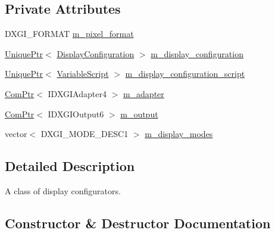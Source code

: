 \subsection*{Private Attributes}
\begin{DoxyCompactItemize}
\item 
D\+X\+G\+I\+\_\+\+F\+O\+R\+M\+AT \hyperlink{classmage_1_1_display_configurator_a22998ef4e54c3da0118a734164792b8f}{m\+\_\+pixel\+\_\+format}
\item 
\hyperlink{namespacemage_a3316d7143a973e37adf1110f2e80ca31}{Unique\+Ptr}$<$ \hyperlink{structmage_1_1_display_configuration}{Display\+Configuration} $>$ \hyperlink{classmage_1_1_display_configurator_a5bccdf0eb57db38cf4e933ecf127488d}{m\+\_\+display\+\_\+configuration}
\item 
\hyperlink{namespacemage_a3316d7143a973e37adf1110f2e80ca31}{Unique\+Ptr}$<$ \hyperlink{classmage_1_1_variable_script}{Variable\+Script} $>$ \hyperlink{classmage_1_1_display_configurator_ab4030a5fe67b8253113799f42a0868c0}{m\+\_\+display\+\_\+configuration\+\_\+script}
\item 
\hyperlink{namespacemage_ae74f374780900893caa5555d1031fd79}{Com\+Ptr}$<$ I\+D\+X\+G\+I\+Adapter4 $>$ \hyperlink{classmage_1_1_display_configurator_a2839c57559a284d6cfbedaaa1a8bcd9f}{m\+\_\+adapter}
\item 
\hyperlink{namespacemage_ae74f374780900893caa5555d1031fd79}{Com\+Ptr}$<$ I\+D\+X\+G\+I\+Output6 $>$ \hyperlink{classmage_1_1_display_configurator_a255fdce7019b54a3a96021248acad680}{m\+\_\+output}
\item 
vector$<$ D\+X\+G\+I\+\_\+\+M\+O\+D\+E\+\_\+\+D\+E\+S\+C1 $>$ \hyperlink{classmage_1_1_display_configurator_a714608c9858f92cead47314295f17f96}{m\+\_\+display\+\_\+modes}
\end{DoxyCompactItemize}


\subsection{Detailed Description}
A class of display configurators. 

\subsection{Constructor \& Destructor Documentation}
\hypertarget{classmage_1_1_display_configurator_a88fe13ec0a6902fdc1666a2710a16647}{}\label{classmage_1_1_display_configurator_a88fe13ec0a6902fdc1666a2710a16647} 
